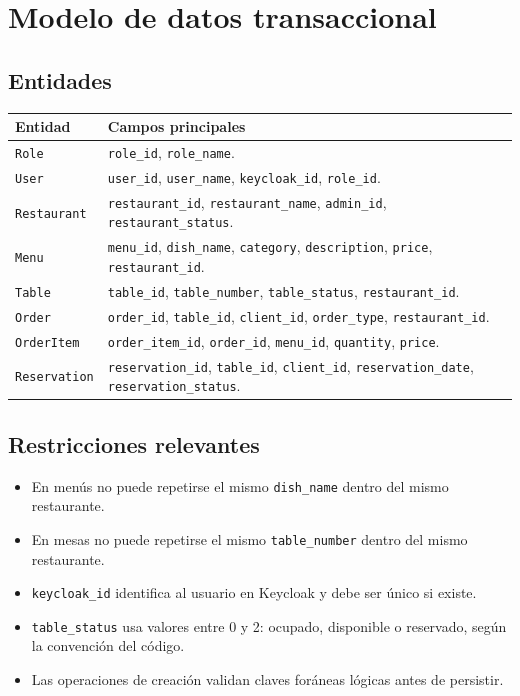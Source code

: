 \documentclass[12pt,letterpaper]{article}
\def\codefile#1{\nolinkurl{#1}}
\begin{document}
\section{Modelo de datos transaccional}

\subsection{Entidades}

\begin{longtable}{p{}p{}}
\toprule
\textbf{Entidad} & \textbf{Campos principales}\\
\midrule
\codefile{Role} & \codefile{role\_id}, \codefile{role\_name}.\\
\codefile{User} & \codefile{user\_id}, \codefile{user\_name}, \codefile{keycloak\_id}, \codefile{role\_id}.\\
\codefile{Restaurant} & \codefile{restaurant\_id}, \codefile{restaurant\_name}, \codefile{admin\_id}, \codefile{restaurant\_status}.\\
\codefile{Menu} & \codefile{menu\_id}, \codefile{dish\_name}, \codefile{category}, \codefile{description}, \codefile{price}, \codefile{restaurant\_id}.\\
\codefile{Table} & \codefile{table\_id}, \codefile{table\_number}, \codefile{table\_status}, \codefile{restaurant\_id}.\\
\codefile{Order} & \codefile{order\_id}, \codefile{table\_id}, \codefile{client\_id}, \codefile{order\_type}, \codefile{restaurant\_id}.\\
\codefile{OrderItem} & \codefile{order\_item\_id}, \codefile{order\_id}, \codefile{menu\_id}, \codefile{quantity}, \codefile{price}.\\
\codefile{Reservation} & \codefile{reservation\_id}, \codefile{table\_id}, \codefile{client\_id}, \codefile{reservation\_date}, \codefile{reservation\_status}.\\
\bottomrule
\end{longtable}

\subsection{Restricciones relevantes}

\begin{itemize}
    \item En menús no puede repetirse el mismo \codefile{dish\_name} dentro del mismo restaurante.
    \item En mesas no puede repetirse el mismo \codefile{table\_number} dentro del mismo restaurante.
    \item \codefile{keycloak\_id} identifica al usuario en Keycloak y debe ser único si existe.
    \item \codefile{table\_status} usa valores entre 0 y 2: ocupado, disponible o reservado, según la convención del código.
    \item Las operaciones de creación validan claves foráneas lógicas antes de persistir.
\end{itemize}
\end{document}
